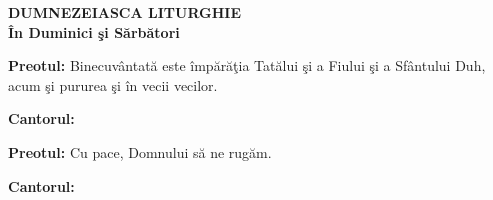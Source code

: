 \documentclass[12pt]{book}
\begin{document}
  
  \begin{center}
    {\LARGE \bf DUMNEZEIASCA LITURGHIE\\
      \vspace{0.1in}
      \^{I}n Duminici \c{s}i S\u{a}rb\u{a}tori}
  \end{center}

  \vspace{0.5in}
  
  {\bf Preotul:} Binecuv\^{a}ntat\u{a} este \^{i}mp\u{a}r\u{a}\c{t}ia
  Tat\u{a}lui \c{s}i a Fiului \c{s}i a Sf\^{a}ntului Duh, acum \c{s}i
  pururea \c{s}i \^{i}n vecii vecilor.

  {\bf Cantorul:}
  \begin{figure}[h]
    \begin{center}
    \end{center}
  \end{figure}

  {\bf Preotul:} Cu pace, Domnului s\u{a} ne rug\u{a}m.

  {\bf Cantorul:}
  \begin{figure}[h]
    \begin{center}
    \end{center}
  \end{figure}

\pagebreak
\pagestyle{myheadings} \markright{\hfill \small } \setcounter{page}{1}
\end{document}
